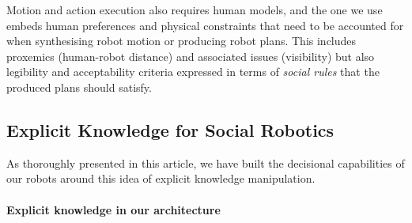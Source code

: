 \documentclass[preprint,3p,times]{elsarticle}
\newcommand{\eg}{e.g.\xspace}
\begin{document}
Motion and action execution also requires human models, and the one we use
embeds human preferences and physical constraints that need to be accounted for
when synthesising robot motion or producing robot plans. This includes
proxemics (human-robot distance) and associated issues (visibility) but also
legibility and acceptability criteria expressed in terms of \emph{social rules}
that the produced plans should satisfy.

%
%


\subsection{Explicit Knowledge for Social Robotics}
\label{krs-discussion}

As thoroughly presented in this article, we have built the decisional
capabilities of our robots around this idea of explicit knowledge manipulation.

\paragraph{Explicit knowledge in our architecture}
\end{document}
